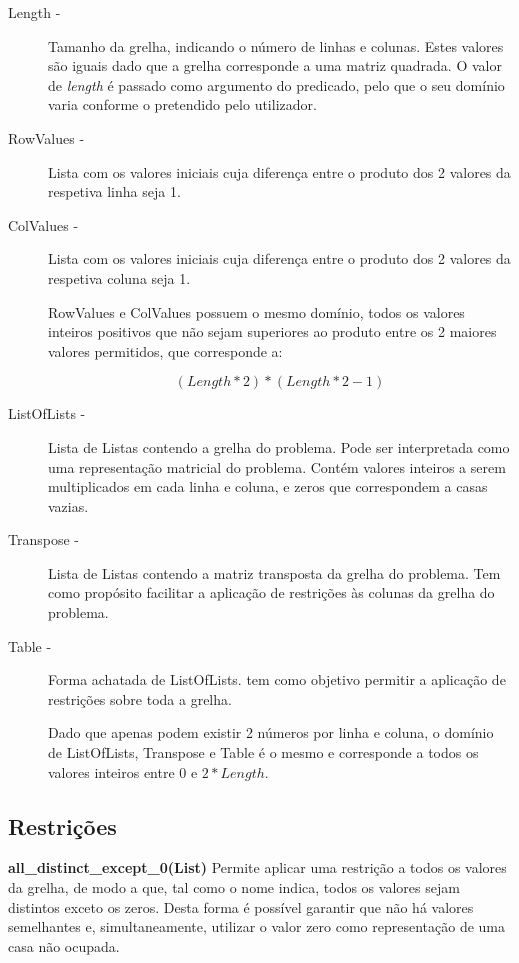 \documentclass[11pt]{article}
\begin{document}
\begin{description}

\item[Length - ] Tamanho da grelha, indicando o número de linhas e colunas. Estes valores são iguais dado que a grelha corresponde a uma matriz quadrada. O valor de \emph{length} é passado como argumento do predicado, pelo que o seu domínio varia conforme o pretendido pelo utilizador.

\item[RowValues - ] Lista com os valores iniciais cuja diferença entre o produto dos 2 valores da respetiva linha seja 1.

\item[ColValues - ] Lista com os valores iniciais cuja diferença entre o produto dos 2 valores da respetiva coluna seja 1.

RowValues e ColValues possuem o mesmo domínio, todos os valores inteiros positivos que não sejam superiores ao produto entre os 2 maiores valores permitidos, que corresponde a:

\[(Length *2)*(Length * 2 - 1)\]

\item[ListOfLists - ] Lista de Listas contendo a grelha do problema. Pode ser interpretada como uma representação matricial do problema. Contém valores inteiros a serem multiplicados em cada linha e coluna, e zeros que correspondem a casas vazias.

\item[Transpose - ] Lista de Listas contendo a matriz transposta da grelha do problema. Tem como propósito facilitar a aplicação de restrições às colunas da grelha do problema.

\item[Table - ] Forma achatada de ListOfLists. tem como objetivo permitir a aplicação de restrições sobre toda a grelha. 

Dado que apenas podem existir 2 números por linha e coluna, o domínio de ListOfLists, Transpose e Table é o mesmo e corresponde a todos os valores inteiros entre 0 e \(2*Length\).



\end{description}

\subsection{Restrições}

\textbf{ all\_distinct\_except\_0(List)} Permite aplicar uma restrição a todos os valores da grelha, de modo a que, tal como o nome indica, todos os valores sejam distintos exceto os zeros. Desta forma é possível garantir que não há valores semelhantes e, simultaneamente, utilizar o valor zero como representação de uma casa não ocupada.
\end{document}
